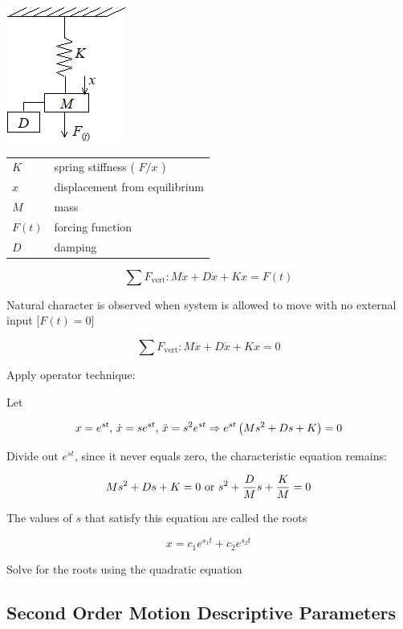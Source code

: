 \documentclass[
]{book}
\begin{document}
\includegraphics{media/08/image28.png}

\begin{longtable}[]{@{}ll@{}}
\toprule
\endhead
\(K\) & spring stiffness ( \(F/x\) )\tabularnewline
\(x\) & displacement from equilibrium\tabularnewline
\(M\) & mass\tabularnewline
\(F\left(t\right)\) & forcing function\tabularnewline
\(D\) & damping\tabularnewline
\bottomrule
\end{longtable}

\[\sum{}{} F_{\mathrm{vert}} : M\ddot{x} + D\dot{x} + Kx = F(t) \]

Natural character is observed when system is allowed to move with no external input {[}\(F(t) = 0\){]}

\[\sum{}{} F_{\mathrm{vert}} : M\ddot{x} + D\dot{x} + Kx = 0 \]

Apply operator technique:

Let

\[
x = e^{st} \text{, } \dot{x} = s e^{st} \text{, } \ddot{x} = s^2 e^{st} \\
\Rightarrow e^{st} \left( M s^2 + D s + K \right) = 0 \\
\]

Divide out \(e^{st}\), since it never equals zero, the characteristic equation remains:

\[
M s^2 + D s + K = 0 \text{ or } s^2 + \frac{D}{M} s + \frac{K}{M} = 0\\
\]

The values of \(s\) that satisfy this equation are called the roots

\[ x = c_1 e^{s_1 t} + c_2 e^{s_2 t} \]

Solve for the roots using the quadratic equation

\hypertarget{second-order-motion-descriptive-parameters}{%
\subsection{Second Order Motion Descriptive Parameters}\label{second-order-motion-descriptive-parameters}}
\end{document}
